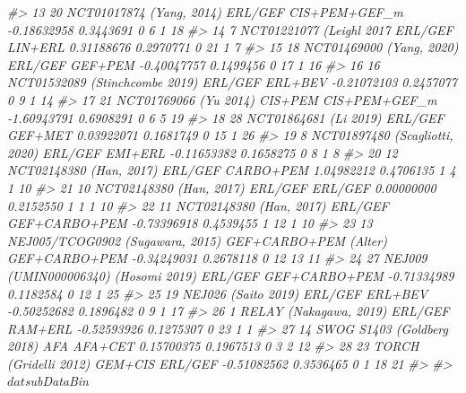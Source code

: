 \documentclass[
]{article}
\newenvironment{Shaded}{\begin{snugshade}}{\end{snugshade}}
\newcommand{\CommentTok}[1]{\textcolor[rgb]{0.56,0.35,0.01}{\textit{#1}}}
\begin{document}
\begin{Shaded}
\begin{Highlighting}[]
\CommentTok{\#\textgreater{} 13 20              NCT01017874 (Yang, 2014)               ERL/GEF CIS+PEM+GEF\_m {-}0.18632958 0.3443691         0   6     1     18}
\CommentTok{\#\textgreater{} 14  7              NCT01221077 (Leighl 2017               ERL/GEF       LIN+ERL  0.31188676 0.2970771         0  21     1      7}
\CommentTok{\#\textgreater{} 15 18              NCT01469000 (Yang, 2020)               ERL/GEF       GEF+PEM {-}0.40047757 0.1499456         0  17     1     16}
\CommentTok{\#\textgreater{} 16 16        NCT01532089 (Stinchcombe 2019)               ERL/GEF       ERL+BEV {-}0.21072103 0.2457077         0   9     1     14}
\CommentTok{\#\textgreater{} 17 21                 NCT01769066 (Yu 2014)               CIS+PEM CIS+PEM+GEF\_m {-}1.60943791 0.6908291         0   6     5     19}
\CommentTok{\#\textgreater{} 18 28                 NCT01864681 (Li 2019)               ERL/GEF       GEF+MET  0.03922071 0.1681749         0  15     1     26}
\CommentTok{\#\textgreater{} 19  8        NCT01897480 (Scagliotti, 2020)               ERL/GEF       EMI+ERL {-}0.11653382 0.1658275         0   8     1      8}
\CommentTok{\#\textgreater{} 20 12               NCT02148380 (Han, 2017)               ERL/GEF     CARBO+PEM  1.04982212 0.4706135         1   4     1     10}
\CommentTok{\#\textgreater{} 21 10               NCT02148380 (Han, 2017)               ERL/GEF       ERL/GEF  0.00000000 0.2152550         1   1     1     10}
\CommentTok{\#\textgreater{} 22 11               NCT02148380 (Han, 2017)               ERL/GEF GEF+CARBO+PEM {-}0.73396918 0.4539455         1  12     1     10}
\CommentTok{\#\textgreater{} 23 13      NEJ005/TCOG0902 (Sugawara, 2015) GEF+CARBO+PEM (Alter) GEF+CARBO+PEM {-}0.34249031 0.2678118         0  12    13     11}
\CommentTok{\#\textgreater{} 24 27  NEJ009 (UMIN000006340) (Hosomi 2019)               ERL/GEF GEF+CARBO+PEM {-}0.71334989 0.1182584         0  12     1     25}
\CommentTok{\#\textgreater{} 25 19                   NEJ026 (Saito 2019)               ERL/GEF       ERL+BEV {-}0.50252682 0.1896482         0   9     1     17}
\CommentTok{\#\textgreater{} 26  1                RELAY (Nakagawa, 2019)               ERL/GEF       RAM+ERL {-}0.52593926 0.1275307         0  23     1      1}
\CommentTok{\#\textgreater{} 27 14            SWOG S1403 (Goldberg 2018)                   AFA       AFA+CET  0.15700375 0.1967513         0   3     2     12}
\CommentTok{\#\textgreater{} 28 23                 TORCH (Gridelli 2012)               GEM+CIS       ERL/GEF {-}0.51082562 0.3536465         0   1    18     21}
\CommentTok{\#\textgreater{} }
\CommentTok{\#\textgreater{} $dat$subDataBin}

\end{Highlighting}
\end{Shaded}
\end{document}
